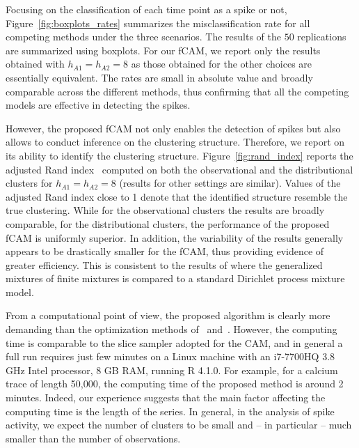 Focusing on the classification of each time point as a spike or not, Figure~\ref{fig:boxplots_rates} summarizes the misclassification rate for all competing methods under the three scenarios. The results of the $50$ replications are summarized using boxplots. For our fCAM, we report only the results obtained with $h_{A1} = h_{A2} = 8$ as those obtained for the other choices are essentially equivalent.  The rates are small in absolute value and broadly comparable across the different methods, thus confirming that all the competing models are effective in detecting the spikes.  

However, the proposed fCAM not only enables the detection of spikes but also allows to conduct inference on the clustering structure. Therefore, we report on its ability to identify the clustering structure. Figure~\ref{fig:rand_index} reports the adjusted Rand index~\citep{rand1971,hubert1985} computed on both the observational and the distributional clusters for $h_{A1} = h_{A2} = 8$ (results for other settings are similar). Values of the adjusted Rand index close to 1 denote that the identified structure resemble the true clustering. While for the observational clusters the results are broadly comparable, for the distributional clusters, the performance of the proposed fCAM is uniformly superior. In addition, the variability of the results generally appears to be drastically smaller for the fCAM, thus providing evidence of greater efficiency. This is consistent to the results of \citet{fruhwirthschnatter2020} where  the generalized mixtures of finite mixtures is compared to a standard Dirichlet process mixture model. 

From a computational point of view, the proposed algorithm is clearly more demanding than the optimization methods of~\citet{jewell2019} and~\citet{friedrich2017}.  However, the computing time is comparable to the slice sampler adopted for the CAM, and in general a full run requires just few minutes on a Linux machine with an i7-7700HQ 3.8 GHz Intel processor, 8 GB RAM, running R 4.1.0. For example, for a calcium trace of length 50,000, the computing time of the proposed method is around 2 minutes. Indeed, our experience suggests that the main factor affecting the computing time is the length of the series.  In general, in the analysis of spike activity, we expect the number of clusters  to be small and -- in particular -- much smaller than the number of observations.


